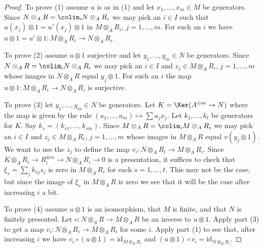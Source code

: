\begin{proof}
To prove (1) assume $u$ is as in (1) and
let $x_1, \ldots, x_m \in M$ be generators. Since
$N \otimes_A R = \colim_i N \otimes_A R_i$
we may pick an $i \in I$ such that $u(x_j) \otimes 1 = u'(x_j) \otimes 1$
in $M \otimes_A R_i$, $j = 1, \ldots, m$.
For such an $i$ we have
$u \otimes 1 = u' \otimes 1 : M \otimes_A R_i \to N \otimes_A R_i$.

\medskip\noindent
To prove (2) assume $u \otimes 1$ surjective and
let $y_1, \ldots, y_m \in N$ be generators. Since
$N \otimes_A R = \colim_i N \otimes_A R_i$
we may pick an $i \in I$ and $z_j \in M \otimes_A R_i$, $j = 1, \ldots, m$
whose images in $N \otimes_A R$ equal $y_j \otimes 1$.
For such an $i$ the map $u \otimes 1 : M \otimes_A R_i \to N \otimes_A R_i$
is surjective.

\medskip\noindent
To prove (3) let $y_1, \ldots, y_m \in N$ be generators. Let
$K = \Ker(A^{\oplus m} \to N)$ where the map is given by
the rule $(a_1, \ldots, a_m) \mapsto \sum a_j x_j$. Let $k_1, \ldots, k_t$
be generators for $K$. Say $k_s = (k_{s1}, \ldots, k_{sm})$.
Since $M \otimes_A R = \colim_i M \otimes_A R_i$
we may pick an $i \in I$ and $z_j \in M \otimes_A R_i$, $j = 1, \ldots, m$
whose images in $M \otimes_A R$ equal $v(y_j \otimes 1)$.
We want to use the $z_j$ to define the map
$v_i : N \otimes_A R_i \to M \otimes_A R_i$.
Since $K \otimes_A R_i \to R_i^{\oplus m} \to N \otimes_A R_i \to 0$
is a presentation, it suffices to check that $\xi_s = \sum_j k_{sj}z_j$ is
zero in $M \otimes_A R_i$ for each $s = 1, \ldots, t$. This may not
be the case, but since the image of $\xi_s$ in $M \otimes_A R$ is zero
we see that it will be the case after increasing $i$ a bit.

\medskip\noindent
To prove (4) assume $u \otimes 1$ is an isomorphism, that
$M$ is finite, and that $N$ is finitely presented.
Let $v : N \otimes_A R \to M \otimes_A R$ be an inverse to
$u \otimes 1$. Apply part (3) to get a map
$v_i : N \otimes_A R_i \to M \otimes_A R_i$ for some $i$.
Apply part (1) to see that, after increasing $i$ we have
$v_i \circ (u \otimes 1) = \text{id}_{M \otimes_R R_i}$ and
$(u \otimes 1) \circ v_i = \text{id}_{N \otimes_R R_i}$.
\end{proof}

